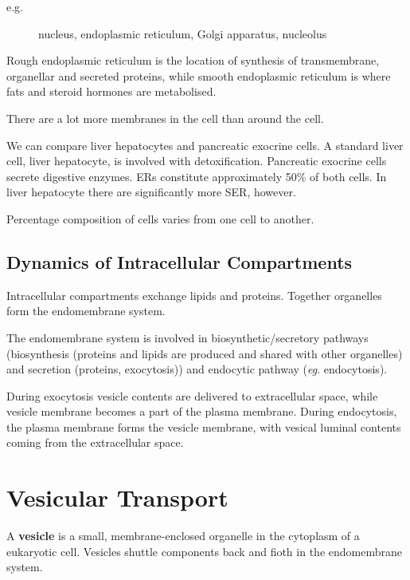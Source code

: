 \documentclass[11pt]{scrartcl}
\begin{document}
\begin{description}

\item[e.g.] nucleus, endoplasmic reticulum, Golgi apparatus, nucleolus

\end{description}

Rough endoplasmic reticulum is the location of synthesis of
transmembrane, organellar and secreted proteins, while smooth
endoplasmic reticulum is where fats and steroid hormones are metabolised.

There are a lot more membranes in the cell than around the cell.

We can compare liver hepatocytes and pancreatic exocrine cells.  A
standard liver cell, liver hepatocyte, is involved with
detoxification. Pancreatic exocrine cells secrete digestive
enzymes. ERs constitute approximately 50\% of both cells. In liver
hepatocyte there are significantly more SER, however.

Percentage composition of cells varies from one cell to another.

\subsection{Dynamics of Intracellular Compartments}

Intracellular compartments exchange lipids and proteins. Together
organelles form the endomembrane system.

The endomembrane system is involved in biosynthetic/secretory pathways (biosynthesis (proteins and lipids are produced and shared with other organelles) and secretion (proteins, exocytosis)) and endocytic pathway (\textit{eg}. endocytosis).

During exocytosis vesicle contents are delivered to extracellular space, while vesicle membrane becomes a part of the plasma membrane. During endocytosis, the plasma membrane forms the vesicle membrane, with vesical luminal contents coming from the extracellular space.

\section{Vesicular Transport}

\begin{definition}
  A \textbf{vesicle} is a small, membrane-enclosed organelle in the
  cytoplasm of a eukaryotic cell. Vesicles shuttle components back and fioth in the endomembrane system.
\end{definition}
\end{document}

